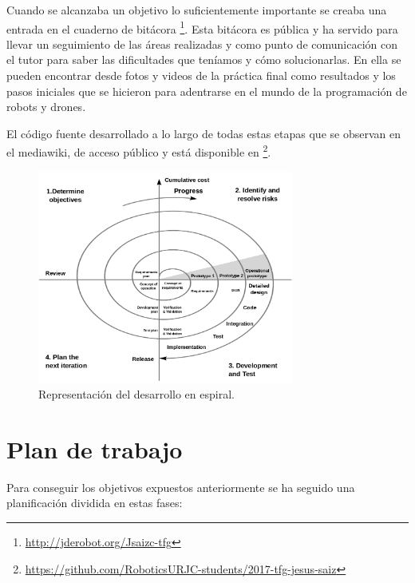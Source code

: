 \hspace{1cm} Cuando se alcanzaba un objetivo lo suficientemente importante se creaba una entrada en el cuaderno de bitácora \footnote{\url{http://jderobot.org/Jsaizc-tfg}}. Esta bitácora es pública y ha servido para llevar un seguimiento de las áreas realizadas y como punto de comunicación con el tutor para saber las dificultades que teníamos y cómo solucionarlas. En ella se pueden encontrar desde fotos y videos de la práctica final como resultados y los pasos iniciales que se hicieron para adentrarse en el mundo de la programación de robots y drones.

\hspace{1cm} El código fuente desarrollado a lo largo de todas estas etapas que se observan en el mediawiki, de acceso público y está disponible en  \footnote{\url{https://github.com/RoboticsURJC-students/2017-tfg-jesus-saiz}}.
\\

\begin{figure}[H]
	\begin{center}
		\includegraphics[width=0.75\textwidth]{imag/IMG17.png}
				\caption{Representación del desarrollo en espiral.} 
	\label{fig:Desarrollo en espiral.}	
	\end{center}
\end{figure}


\section{Plan de trabajo}
\hspace{1cm} Para conseguir los objetivos expuestos anteriormente se ha seguido una planificación dividida en estas fases:

